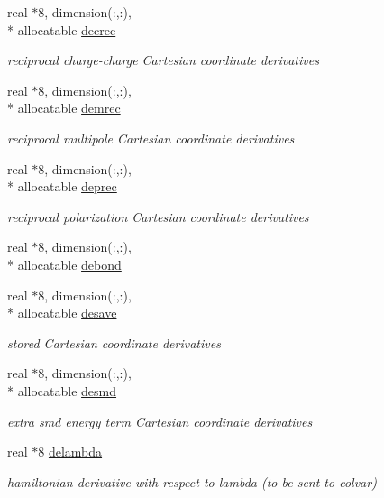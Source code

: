 \begin{DoxyCompactItemize}
real $\ast$8, dimension(\-:,\-:), \\*
allocatable \hyperlink{classderiv_a95c38bb809e639ed11a368c565cf8627}{decrec}
\begin{DoxyCompactList}\small\item\em reciprocal charge-\/charge Cartesian coordinate derivatives \end{DoxyCompactList}\item 
real $\ast$8, dimension(\-:,\-:), \\*
allocatable \hyperlink{classderiv_a43a2a9492e8d05870a46581134371eac}{demrec}
\begin{DoxyCompactList}\small\item\em reciprocal multipole Cartesian coordinate derivatives \end{DoxyCompactList}\item 
real $\ast$8, dimension(\-:,\-:), \\*
allocatable \hyperlink{classderiv_ab2d4c03ab52a5e5facc97ac8cf9abac7}{deprec}
\begin{DoxyCompactList}\small\item\em reciprocal polarization Cartesian coordinate derivatives \end{DoxyCompactList}\item 
real $\ast$8, dimension(\-:,\-:), \\*
allocatable \hyperlink{classderiv_aebc93b62282db8e737081b270eeb18ca}{debond}
\item 
real $\ast$8, dimension(\-:,\-:), \\*
allocatable \hyperlink{classderiv_a725a18c2a6db9a96ba1b2e4b86256617}{desave}
\begin{DoxyCompactList}\small\item\em stored Cartesian coordinate derivatives \end{DoxyCompactList}\item 
real $\ast$8, dimension(\-:,\-:), \\*
allocatable \hyperlink{classderiv_a64aef9d688475a6de56080c342300aa2}{desmd}
\begin{DoxyCompactList}\small\item\em extra smd energy term Cartesian coordinate derivatives \end{DoxyCompactList}\item 
real $\ast$8 \hyperlink{classderiv_a3b2dad59531deb6bf5982e8a48e970c7}{delambda}
\begin{DoxyCompactList}\small\item\em hamiltonian derivative with respect to lambda (to be sent to colvar) \end{DoxyCompactList}\item 

\end{DoxyCompactItemize}
